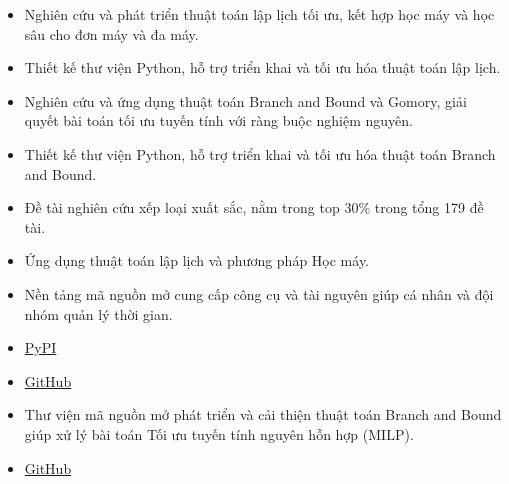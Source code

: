 \documentclass[10pt,a4paper,ragged2e,withhyper]{altacv}
\begin{document}
\begin{paracol}{2}


\begin{itemize}
\item Nghiên cứu và phát triển thuật toán lập lịch tối ưu, kết hợp học máy và học sâu cho đơn máy và đa máy.
\item Thiết kế thư viện Python, hỗ trợ triển khai và tối ưu hóa thuật toán lập lịch.
\end{itemize}

\divider

\begin{itemize}
\item Nghiên cứu và ứng dụng thuật toán Branch and Bound và Gomory, giải quyết bài toán tối ưu tuyến tính với ràng buộc nghiệm nguyên.
\item Thiết kế thư viện Python, hỗ trợ triển khai và tối ưu hóa thuật toán Branch and Bound.
\item Đề tài nghiên cứu xếp loại xuất sắc, nằm trong top 30\% trong tổng 179 đề tài.
\end{itemize}



\begin{itemize}
\item Ứng dụng thuật toán lập lịch và phương pháp Học máy.
\item Nền tảng mã nguồn mở cung cấp công cụ và tài nguyên giúp cá nhân và đội nhóm quản lý thời gian.
\item \href{https://pypi.org/project/TiLearn/}{PyPI} \faPython
\item \href{https://github.com/Bancie/TiLearn}{GitHub} \faGithubSquare
\end{itemize}

\divider

\begin{itemize}
\item Thư viện mã nguồn mở phát triển và cải thiện thuật toán Branch and Bound giúp xử lý bài toán Tối ưu tuyến tính nguyên hỗn hợp (MILP).
\item \href{https://github.com/Bancie/Optimization-Oracle}{GitHub} \faGithubSquare
\end{itemize}


\end{paracol}
\end{document}
